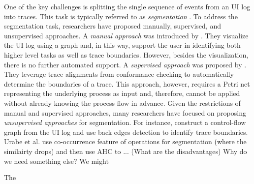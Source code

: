
One of the key challenges is splitting the single sequence of events from an UI log into traces. This task is typically referred to as \textit{segmentation} \cite{Urabe21,leno2021robotic}. To address the segmentation task, researchers have proposed manually, supervised, and unsupervised approaches. A \textit{manual approach} was introduced by \cite{urabe2019visualizing}. They visualize the UI log using a graph and, in this way, support the user in identifying both higher level tasks as well as trace boundaries. However, besides the visualization, there is no further automated support. A \textit{supervised approach} was proposed by \cite{agostinelli202111}. They leverage trace alignments from conformance checking to automatically determine the boundaries of a trace. This approach, however, requires a Petri net representing the underlying process as input and, therefore, cannot be applied without already knowing the process flow in advance. Given the restrictions of manual and supervised approaches, many researchers have focused on proposing \textit{unsupervised approaches} for segmentation. For instance, \cite{leno2020identifying} construct a control-flow graph from the UI log and use back edges detection to identify trace boundaries. Urabe et al. \cite{Urabe21} use co-occurrence feature of operations for segmentation (where the similairty drops) and then use AHC to ... (What are the disadvantages) Why do we need something else? We might 

The 




